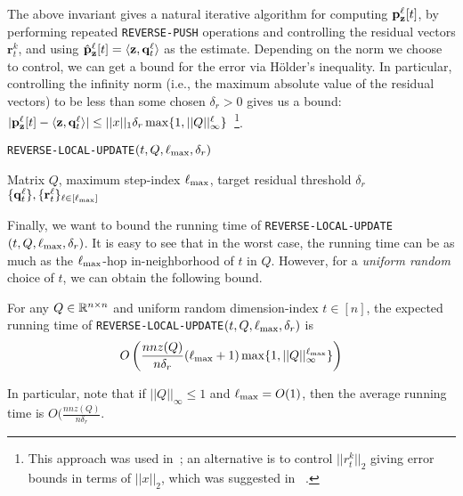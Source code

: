 The above invariant gives a natural iterative algorithm for computing ${\mathbf{p}}_\mathbf{z}^{\ell}[t]$, by performing repeated \texttt{REVERSE-PUSH} operations and controlling the residual vectors $\mathbf{r}_t^k$, and using $\hat{\mathbf{p}}_\mathbf{z}^{\ell}[t] = \langle\mathbf{z},\mathbf{q}_t^{\ell}\rangle$ as the estimate. 
Depending on the norm we choose to control, we can get a bound for the error via H{\"o}lder's inequality.
In particular, controlling the infinity norm (i.e., the maximum absolute value of the residual vectors) to be less than some chosen $\delta_r>0$ gives us a bound: $|{\mathbf{p}}_\mathbf{z}^{\ell}[t] - \langle\mathbf{z},\mathbf{q}_t^{\ell}\rangle|\leq ||x||_1\delta_r\max\{1,||Q||_{\infty}^{\ell}\}$~\footnote{This approach was used in~\cite{andersen2007local,Lofgren2014,banerjee2015fast}; an alternative is to control $||r_t^k||_2$ giving error bounds in terms of $||x||_2$, which was suggested in ~\cite{lee2014asynchronous}.}.

\begin{algorithm}[ht]
\caption{\texttt{REVERSE-LOCAL-UPDATE}$(t,Q, \ell_{\max}, \delta_r)$}
\label{alg:rwork}
\begin{algorithmic}[1]
\REQUIRE Matrix $Q$, maximum step-index $\ell_{\max}$, target residual threshold $\delta_r$
\ENDWHILE
\ENDFOR
\RETURN $\{\mathbf{q}^{\ell}_t\}, \{\mathbf{r}^{\ell}_t\}_{\ell\in[\ell_{\max}]}$
\end{algorithmic}
\end{algorithm}    

Finally, we want to bound the running time of \texttt{REVERSE-LOCAL-UPDATE}$(t,Q,\ell_{\max},\delta_r)$. 
It is easy to see that in the worst case, the running time can be as much as the $\ell_{\max}$-hop in-neighborhood of $t$ in $Q$. 
However, for a \emph{uniform random} choice of $t$, we can obtain the following bound.

\begin{lemma}
\label{lem:pushinvariant}
For any $Q\in\mathbb{R}^{n\times n}$ and uniform random dimension-index $t\in[n]$, the expected running time of \texttt{REVERSE-LOCAL-UPDATE}$(t,Q,\ell_{\max},\delta_r)$ is 
$$O\left(\frac{nnz(Q)}{n\delta_r}(\ell_{\max}+1)\max\{1,||Q||_{\infty}^{\ell_{\max}}\}\right)$$ 
\end{lemma}

In particular, note that if $||Q||_{\infty}\leq 1$ and $\ell_{\max}=O(1)$, then the average running time is $O(\frac{nnz(Q)}{n\delta_r}$.

